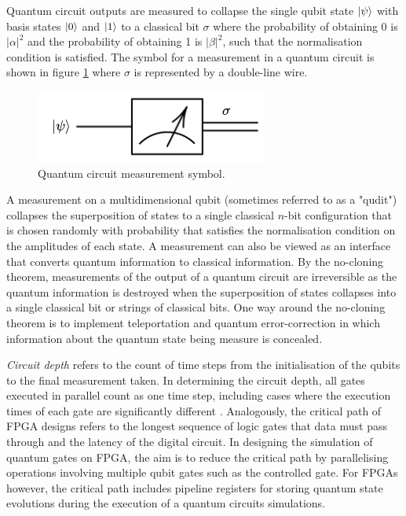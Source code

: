 Quantum circuit outputs are measured to collapse the single qubit state $\ket{\psi}$ with basis states $\ket{0}$ and $\ket{1}$ to a classical bit $\sigma$ where the probability of obtaining $0$ is $|\alpha|^2$ and the probability of obtaining 1 is $|\beta|^2$, such that the normalisation condition is satisfied. The symbol for a measurement in a quantum circuit is shown in figure \ref{fig:measurement-symbol} where $\sigma$ is represented by a double-line wire. 
\begin{figure}[!ht]
	\centering
	\includegraphics[width=0.70\linewidth]{body/ch2/figs/measurement-symbol}
	\caption[Quantum circuit measurement symbol.]{Quantum circuit measurement symbol.}
	\label{fig:measurement-symbol}
\end{figure}
A measurement on a multidimensional qubit (sometimes referred to as a "qudit") collapses the superposition of states to a single classical $n$-bit configuration that is chosen randomly with probability that satisfies the normalisation condition on the amplitudes of each state. A measurement can also be viewed as an interface that converts quantum information to classical information. By the no-cloning theorem, measurements of the output of a quantum circuit are irreversible as the quantum information is destroyed when the superposition of states collapses into a single classical bit or strings of classical bits. One way around the no-cloning theorem is to implement teleportation and quantum error-correction in which information about the quantum state being measure is concealed. 
 
\textit{Circuit depth} refers to the count of time steps from the initialisation of the qubits to the final measurement taken. In determining the circuit depth, all gates executed in parallel count as one time step, including cases where the execution times of each gate are significantly different \cite{de2021reducing}. Analogously, the critical path of FPGA designs refers to the longest sequence of logic gates that data must pass through and the latency of the digital circuit. In designing the simulation of quantum gates on FPGA, the aim is to reduce the critical path by parallelising operations involving multiple qubit gates such as the controlled gate. For FPGAs however, the critical path includes pipeline registers for storing quantum state evolutions during the execution of a quantum circuits simulations.


